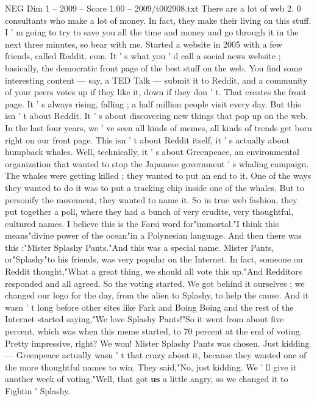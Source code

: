 \begin{textsample}{NEG Dim 1 – 2009 – Score 1.00 – 2009/t002908.txt}  \label{ex:f1_neg_052}
There are a lot of web 2. 0 consultants who make a lot of money.
In fact, they make their living on this stuff.
I ' m going to try to save you all the time and money and go through it in the next three minutes, so bear with me.
Started a website in 2005 with a few friends, called Reddit. com.
It ' s what you ' d call a social news website ; basically, the democratic front page of the best stuff on the web.
You find some interesting content — say, a TED Talk — submit it to Reddit, and a community of your peers votes up if they like it, down if they don ' t.
That creates the front page.
It ' s always rising, falling ; a half million people visit every day.
But this isn ' t about Reddit.
It ' s about discovering new things that pop up on the web.
In the last four years, we ' ve seen all kinds of memes, all kinds of trends get born right on our front page.
This isn ' t about Reddit itself, it ' s actually about humpback whales.
Well, technically, it ' s about Greenpeace, an environmental organization that wanted to stop the Japanese government ' s whaling campaign.
The whales were getting killed ; they wanted to put an end to it.
One of the ways they wanted to do it was to put a tracking chip inside one of the whales.
But to personify the movement, they wanted to name it.
So in true web fashion, they put together a poll, where they had a bunch of very erudite, very thoughtful, cultured names.
I believe this is the Farsi word for"immortal."I think this means"divine power of the ocean"in a Polynesian language.
And then there was this :"Mister Splashy Pants."And this was a special name.
Mister Pants, or"Splashy"to his friends, was very popular on the Internet.
In fact, someone on Reddit thought,"What a great thing, we should all vote this up."And Redditors responded and all agreed.
So the voting started.
We got behind it ourselves ; we changed our logo for the day, from the alien to Splashy, to help the cause.
And it wasn ' t long before other sites like Fark and Boing Boing and the rest of the Internet started saying,"We love Splashy Pants!"So it went from about five percent, which was when this meme started, to 70 percent at the end of voting.
Pretty impressive, right?
We won!
Mister Splashy Pants was chosen.
Just kidding — Greenpeace actually wasn ' t that crazy about it, because they wanted one of the more thoughtful names to win.
They said,"No, just kidding.
We ' ll give it another week of voting."Well, that got \textbf{us} a little angry, so we changed it to Fightin ' Splashy.

\end{textsample}
